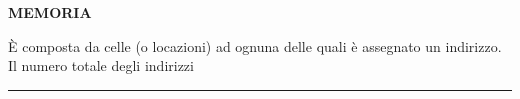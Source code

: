 \documentclass[8pt]{extarticle}
\newenvironment{formulario}
{
\setlength{\columnsep}{3em}
\twocolumn
\lstset{tabsize=3}
\begin{spacing}{1}
\begin{flushleft}
}{
\end{flushleft}
\end{spacing}
}
\newenvironment{tcenter}{
  \par
  \centering
  \setlength{\parskip}{0pt} %
  \noindent
}{
  \par
}
\newenvironment{myParagraph}[1]
{
\begin{tcenter}
\textbf{#1}
\end{tcenter}
}{
\myRule
}
\newcommand{\myRule}{\rule{250pt}{0.1pt}}
\begin{document}
\begin{formulario}
	\begin{myParagraph}{MEMORIA}
È composta da celle (o locazioni) ad ognuna delle quali è assegnato un indirizzo. Il numero totale degli indirizzi 
	\end{myParagraph}
	
\end{formulario}
\end{document}
